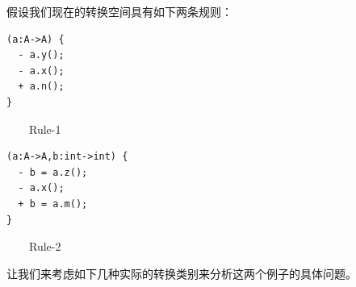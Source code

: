 假设我们现在的转换空间具有如下两条规则：
\begin{center}
\begin{smpage}{0.25\columnwidth}
\begin{lstlisting}[style=patl,frame=none]
(a:A->A) {
  - a.y();
  - a.x(); 
  + a.n(); 
}
\end{lstlisting}
~~~~{\small Rule-1}
\end{smpage}
\qquad\quad
\begin{smpage}{0.35\columnwidth}
\begin{lstlisting}[style=patl,frame=none]
(a:A->A,b:int->int) {
  - b = a.z();
  - a.x();
  + b = a.m(); 
}
\end{lstlisting}
~~~~{\small Rule-2}
\end{smpage}
\end{center}
让我们来考虑如下几种实际的转换类别来分析这两个例子的具体问题。
